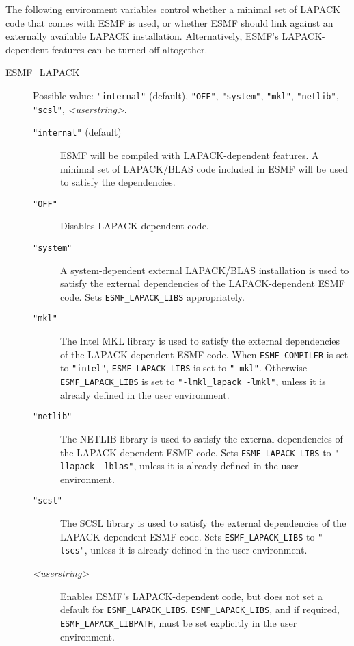 The following environment variables control whether a minimal set of
LAPACK code that comes with ESMF is used, or whether ESMF should link against
an externally available LAPACK installation. Alternatively, ESMF's
LAPACK-dependent features can be turned off altogether.

\begin{description}

\item[ESMF\_LAPACK] Possible value: {\tt "internal"} (default), {\tt "OFF"},
 {\tt "system"}, {\tt "mkl"}, {\tt "netlib"}, {\tt "scsl"}, {\it <userstring>}.

\begin{description}
\item[{\tt "internal"} (default)] ESMF will be compiled with LAPACK-dependent
features. A minimal set of LAPACK/BLAS code included in ESMF will be used
to satisfy the dependencies.

\item[{\tt "OFF"}] Disables LAPACK-dependent code.
 
\item[{\tt "system"}] A system-dependent external LAPACK/BLAS installation
is used to satisfy the external dependencies of the LAPACK-dependent ESMF code.
Sets {\tt ESMF\_LAPACK\_LIBS} appropriately.

\item[{\tt "mkl"}] The Intel MKL library is used to satisfy the external 
dependencies of the LAPACK-dependent ESMF code. When {\tt ESMF\_COMPILER} is set to
{\tt "intel"}, {\tt ESMF\_LAPACK\_LIBS} is set to {\tt "-mkl"}.  Otherwise {\tt ESMF\_LAPACK\_LIBS}
is set to {\tt "-lmkl\_lapack -lmkl"}, unless it is already defined in the user 
environment.

\item[{\tt "netlib"}] The NETLIB library is used to satisfy the external 
dependencies of the LAPACK-dependent ESMF code. Sets {\tt ESMF\_LAPACK\_LIBS} to
{\tt "-llapack -lblas"}, unless it is already defined in the user environment.

\item[{\tt "scsl"}] The SCSL library is used to satisfy the external 
dependencies of the LAPACK-dependent ESMF code. Sets {\tt ESMF\_LAPACK\_LIBS} to
{\tt "-lscs"}, unless it is already defined in the user environment.

\item[{\it <userstring>}] Enables ESMF's LAPACK-dependent code, but does not set
a default for {\tt ESMF\_LAPACK\_LIBS}.  {\tt ESMF\_LAPACK\_LIBS}, and if 
required, {\tt ESMF\_LAPACK\_LIBPATH}, must be set explicitly in the user 
environment.
\end{description}


\end{description}
